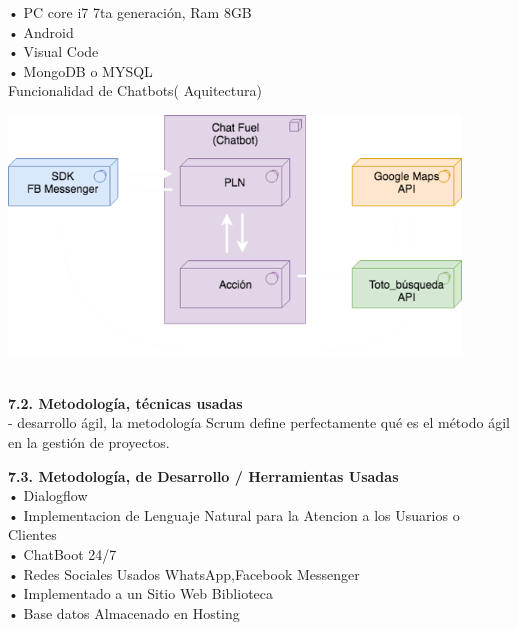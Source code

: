 \begin{flushleft}
\begin{itemize}
•	PC core i7 7ta generación, Ram 8GB \\
•	Android \\
•	Visual Code\\
•	MongoDB o MYSQL\\
Funcionalidad de Chatbots( Aquitectura)
\begin{center}
	\includegraphics[width=12cm]{./Imagenes/api} 
	\end{center}

\textbf{ }\\
\textbf{7.2.   Metodología, técnicas usadas }\\
-	 desarrollo ágil, la metodología Scrum define perfectamente qué es el método ágil en la gestión de proyectos.

\textbf{7.3.   Metodología, de Desarrollo / Herramientas Usadas}\\
•	 Dialogflow \\
•	 Implementacion de Lenguaje Natural para la Atencion a los Usuarios o Clientes\\
•	 ChatBoot 24/7 \\
•	 Redes Sociales Usados  WhatsApp,Facebook Messenger \\
•	Implementado a un Sitio Web  Biblioteca \\
•	 Base datos Almacenado en Hosting \\


\end{itemize}
\end{flushleft}
